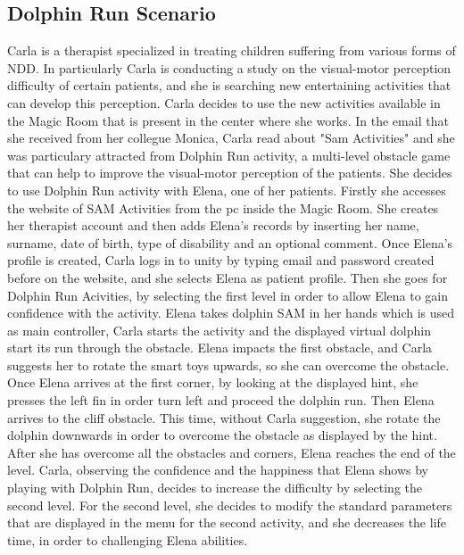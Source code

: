 \subsection{Dolphin Run Scenario}
Carla is a therapist specialized in treating children suffering from various forms of NDD. In particularly Carla is conducting a study on the visual-motor perception difficulty of certain patients, and she is searching new entertaining activities that can develop this perception. \newline
Carla decides to use the new activities available in the Magic Room that is present in the center where she works. In the email that she received from her collegue Monica, Carla read about "Sam Activities" and she was particulary attracted from Dolphin Run activity, a multi-level obstacle game that can help to improve the visual-motor perception of the patients. She decides to use Dolphin Run activity with Elena, one of her patients.
Firstly she accesses the website of SAM Activities from the pc inside the Magic Room. She creates her therapist account and then adds Elena's records by inserting her name, surname, date of birth, type of disability and an optional comment.
Once Elena's profile is created, Carla logs in to unity by typing email and password created before on the website, and she selects Elena as patient profile. Then she goes for Dolphin Run Acivities, by selecting the first level in order to allow Elena to gain confidence with the activity.
Elena takes dolphin SAM in her hands which is used as main controller, Carla starts the activity and the displayed virtual dolphin start its run through the obstacle. Elena impacts the first obstacle, and Carla suggests her to rotate the smart toys upwards, so she can overcome the obstacle. Once Elena arrives at the first corner, by looking at the displayed hint, she presses the left fin in order turn left and proceed the dolphin run. Then Elena arrives to the cliff obstacle. This time, without Carla suggestion, she rotate the dolphin downwards in order to overcome the obstacle as displayed by the hint. After she has overcome all the obstacles and corners, Elena reaches the end of the level.
\newline
Carla, observing the confidence and the happiness that Elena shows by playing with Dolphin Run, decides to increase the difficulty by selecting the second level. For the second level, she decides to modify the standard parameters that are displayed in the menu for the second activity, and she decreases the life time, in order to challenging Elena abilities. \newline

